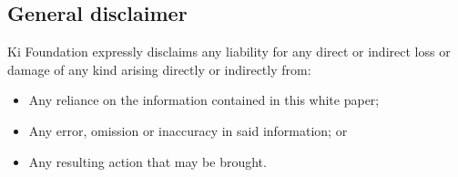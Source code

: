 \subsection{General disclaimer}
Ki Foundation expressly disclaims any liability for any direct or indirect loss or damage of any kind arising directly or indirectly from:
\begin{itemize}
    \item Any reliance on the information contained in this white paper;
    \item Any error, omission or inaccuracy in said information; or
    \item Any resulting action that may be brought.
\end{itemize}

\pagebreak
\clearpage



